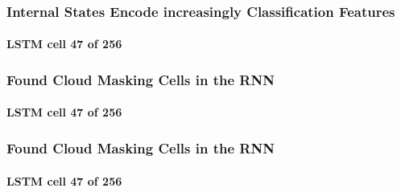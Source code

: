 
\begin{frame}
\frametitle{Internal States Encode increasingly Classification Features}
\framesubtitle{LSTM cell \textbf{47} of 256}
\end{frame}
%

\begin{frame}
\frametitle{Found Cloud Masking Cells in the RNN}
\framesubtitle{LSTM cell \textbf{47} of 256}
\end{frame}

\begin{frame}
\frametitle{Found Cloud Masking Cells in the RNN}
\framesubtitle{LSTM cell \textbf{47} of 256}
\end{frame}
%
%	
%
%	


